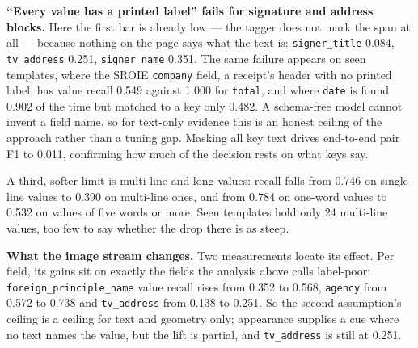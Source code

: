 \documentclass[11pt,a4paper]{article}
\newcommand{\code}[1]{\texttt{\small #1}}
\begin{document}
\textbf{``Every value has a printed label'' fails for signature and address blocks.} Here the
first bar is already low --- the tagger does not mark the span at all --- because nothing on the
page says what the text is: \code{signer\_title} 0.084, \code{tv\_address} 0.251,
\code{signer\_name} 0.351. The same failure appears on seen templates, where the SROIE
\code{company} field, a receipt's header with no printed label, has value recall 0.549 against
1.000 for \code{total}, and where \code{date} is found 0.902 of the time but matched to a key only
0.482. A schema-free model cannot invent a field name, so for text-only evidence this is an honest
ceiling of the approach rather than a tuning gap. Masking all key text drives end-to-end pair F1
to 0.011, confirming how much of the decision rests on what keys say.

A third, softer limit is multi-line and long values: recall falls from 0.746 on single-line
values to 0.390 on multi-line ones, and from 0.784 on one-word values to 0.532 on values of five
words or more. Seen templates hold only 24 multi-line values, too few to say whether the drop
there is as steep.

\textbf{What the image stream changes.} Two measurements locate its effect. Per field, its gains
sit on exactly the fields the analysis above calls label-poor:
\code{foreign\_principle\_name} value recall rises from 0.352 to 0.568, \code{agency} from 0.572
to 0.738 and \code{tv\_address} from 0.138 to 0.251. So the second assumption's ceiling is a
ceiling for text and geometry only; appearance supplies a cue where no text names the value, but
the lift is partial, and \code{tv\_address} is still at 0.251.
\end{document}
